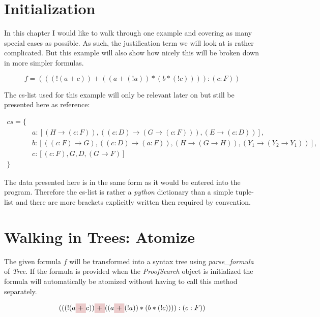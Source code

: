 \section{Initialization}
In this chapter I would like to walk through one example and covering as many special cases as possible. As such, the justification term we will look at is rather complicated. But this example will also show how nicely this will be broken down in more simpler formulas.

\begin{equation}\label{eq:f}
f = (((!(a+c))+((a+(!a))*(b*(!c)))):(c:F))
\end{equation}


The cs-list used for this example will only be relevant later on but still be presented here as reference:


\begin{equation}
\begin{split}
	cs = \{\\
	& a: [(H \rightarrow (c:F)), ((c:D) \rightarrow (G \rightarrow (c:F))), (E \rightarrow (c:D))],\\
	& b: [((c:F) \rightarrow G), ((c:D) \rightarrow (a:F)), (H \rightarrow (G \rightarrow H)), (Y_1 \rightarrow (Y_2 \rightarrow Y_1))],\\
	& c: [(c:F), G, D, (G \rightarrow F)] \\
	\}
\end{split}
\end{equation}

The data presented here is in the same form as it would be entered into the program. Therefore the cs-list is rather a \emph{python} dictionary than a simple tuple-list and there are more brackets explicitly written then required by convention.


\section{Walking in Trees: Atomize}

The given formula $f$ will be transformed into a syntax tree using \emph{parse\_formula} of \emph{Tree}. If the formula is provided when the \emph{ProofSearch} object is initialized the formula will automatically be atomized without having to call this method separately.

\begin{equation*}
	(((!(a
    \tikz[baseline]{\node[fill=red!20,anchor=base] (t1){$+$};} c))
    \tikz[baseline]{\node[fill=red!20,anchor=base] (t2){$+$};} ((a
    \tikz[baseline]{\node[fill=red!20,anchor=base] (t3){$+$};} (!a))*(b*(!c)))):(c:F))
\end{equation*}

